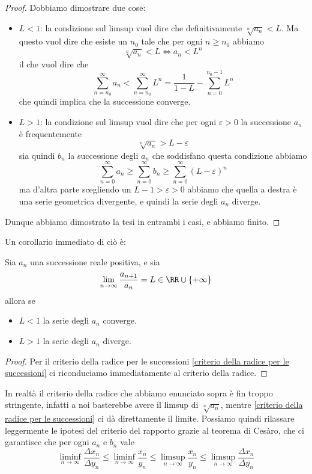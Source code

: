 \documentclass[11pt]{scrartcl}
\begin{document}
	\begin{proof}
		Dobbiamo dimostrare due cose:
		\begin{itemize}
			\item $L<1$: la condizione sul limsup vuol dire che definitivamente $\sqrt[n]{a_n}<L$. Ma questo vuol dire che esiste un $n_0$ tale che per ogni $n\ge n_0$ abbiamo
			$$\sqrt[n]{a_n}<L \iff a_n<L^n$$
			il che vuol dire che
			$$\sum_{n=n_0}^{\infty}a_n <\sum_{n=n_0}^{\infty}L^n=\frac{1}{1-L}-\sum_{n=0}^{n_0-1}L^n$$
			che quindi implica che la successione converge.
			\item $L>1$: la condizione sul limsup vuol dire che per ogni $\varepsilon>0$ la successione $a_n$ è frequentemente 
			$$\sqrt[n]{a_n}>L-\varepsilon$$
			sia quindi $b_n$ la successione degli $a_n$ che soddisfano questa condizione abbiamo
			$$\sum_{n=0}^{\infty}a_n\ge \sum_{n=0}^{\infty}b_n\ge \sum_{n=0}^{\infty}(L-\varepsilon)^n$$
			ma d'altra parte scegliendo un $L-1>\varepsilon>0$ abbiamo che quella a destra è una serie geometrica divergente, e quindi la serie degli $a_n$ diverge.
		\end{itemize}
		Dunque abbiamo dimostrato la tesi in entrambi i casi, e abbiamo finito.
	\end{proof}
	Un corollario immediato di ciò è:
	\begin{corollary}
		Sia $a_n$ una successione reale positiva, e sia 
		$$\lim_{n\to\infty}\frac{a_{n+1}}{a_n}=L\in \RR\cup\left\{+\infty\right\}$$
		allora se
		\begin{itemize}
			\item $L<1$ la serie degli $a_n$ converge.
			\item $L>1$ la serie degli $a_n$ diverge.
		\end{itemize}
	\end{corollary}
	\begin{proof}
		Per il criterio della radice per le successioni \ref{criterio della radice per le successioni} ci riconduciamo immediatamente al criterio della radice.
	\end{proof}
	In realtà il criterio della radice che abbiamo enunciato sopra è fin troppo stringente, infatti a noi basterebbe avere il limsup di $\sqrt[n]{a_n}$, mentre \ref{criterio della radice per le successioni} ci dà direttamente il limite. Possiamo quindi rilassare leggermente le ipotesi del criterio del rapporto grazie al teorema di Cesàro, che ci garantisce che per ogni $a_n$ e $b_n$ vale
	$$\liminf_{n\to\infty}\frac{\Delta x_n}{\Delta y_n}\le \liminf_{n\to\infty} \frac{x_n}{y_n}\le \limsup_{n\to\infty}\frac{x_n}{y_n}\le \limsup_{n\to\infty}\frac{\Delta x_n}{\Delta y_n} $$
\end{document}
